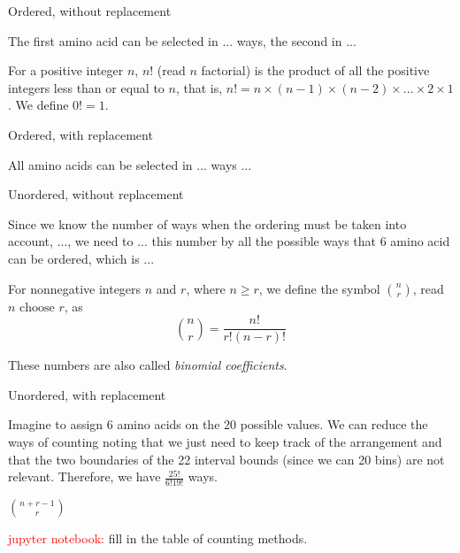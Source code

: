 \documentclass{beamer}
\begin{document}
\begin{frame}{Ordered, without replacement}

	The first amino acid can be selected in ... ways, the second in ... 

	\pause
	\begin{block}{}
		For a positive integer $n$, $n!$ (read $n$ factorial) is the product of all the positive integers less than or equal to $n$, that is, $n! =  n \times (n-1) \times (n-2) \times ... \times 2 \times 1$. We define $0!=1$.
	\end{block}

\end{frame}

\begin{frame}{Ordered, with replacement}

	All amino acids can be selected in ... ways ...

\end{frame}

\begin{frame}{Unordered, without replacement}

	Since we know the number of ways when the ordering must be taken into account, ..., we need to ... this number by all the possible ways that 6 amino acid can be ordered, which is ...

	\pause

	\begin{block}{}
		For nonnegative integers $n$ and $r$, where $n \geq r$, we define the 
		symbol ${n \choose r}$, read $n \text{ choose } r$, as
		\begin{equation*}
			{n \choose r} = \frac{n!}{r!(n-r)!}
		\end{equation*}
	\end{block}
	These numbers are also called \textit{binomial coefficients}.

\end{frame}

\begin{frame}{Unordered, with replacement}

	Imagine to assign 6 amino acids on the 20 possible values. We can reduce the ways of counting noting that we just need to keep track of the arrangement and that the two boundaries of the 22 interval bounds (since we can 20 bins) are not relevant. Therefore, we have $\frac{25!}{6!19!}$ ways.

	${n+r-1} \choose {r}$

	\vskip 1cm

	\textcolor{red}{jupyter notebook:}
	fill in the table of counting methods.

\end{frame}
\end{document}
